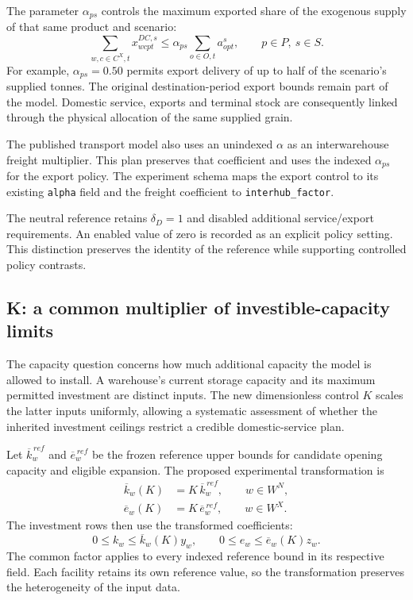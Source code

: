 \documentclass[11pt,a4paper]{article}
\newcommand{\code}[1]{{\small\texttt{#1}}}
\begin{document}
The parameter $\alpha_{ps}$ controls the maximum exported share of the exogenous supply of that same product and scenario:
\begin{equation}
 \sum_{w,c\in C^X,t}x^{DC,s}_{wcpt}
 \le \alpha_{ps}\sum_{o\in O,t}a^s_{opt},
 \qquad p\in P,\ s\in S.
 \label{eq:export}
\end{equation}
For example, $\alpha_{ps}=0.50$ permits export delivery of up to half of the scenario's supplied tonnes. The original destination-period export bounds remain part of the model. Domestic service, exports and terminal stock are consequently linked through the physical allocation of the same supplied grain.

The published transport model also uses an unindexed $\alpha$ as an interwarehouse freight multiplier. This plan preserves that coefficient and uses the indexed $\alpha_{ps}$ for the export policy. The experiment schema maps the export control to its existing \code{alpha} field and the freight coefficient to \code{interhub\_factor}.

The neutral reference retains $\delta_D=1$ and disabled additional service/export requirements. An enabled value of zero is recorded as an explicit policy setting. This distinction preserves the identity of the reference while supporting controlled policy contrasts.

\subsection{K: a common multiplier of investible-capacity limits}
\label{sec:K}

The capacity question concerns how much additional capacity the model is allowed to install. A warehouse's current storage capacity and its maximum permitted investment are distinct inputs. The new dimensionless control $K$ scales the latter inputs uniformly, allowing a systematic assessment of whether the inherited investment ceilings restrict a credible domestic-service plan.

Let $\overline{k}^{\,ref}_w$ and $\overline{e}^{\,ref}_w$ be the frozen reference upper bounds for candidate opening capacity and eligible expansion. The proposed experimental transformation is
\begin{align}
 \overline{k}_w(K)&=K\,\overline{k}^{\,ref}_w,\qquad w\in W^N,\label{eq:Kcandidate}\\
 \overline{e}_w(K)&=K\,\overline{e}^{\,ref}_w,\qquad w\in W^X.
 \label{eq:Kexpand}
\end{align}
The investment rows then use the transformed coefficients:
\begin{equation}
 0\le k_w\le \overline{k}_w(K)y_w,\qquad
 0\le e_w\le \overline{e}_w(K)z_w.
 \label{eq:Kactivation}
\end{equation}
The common factor applies to every indexed reference bound in its respective field. Each facility retains its own reference value, so the transformation preserves the heterogeneity of the input data.
\end{document}
